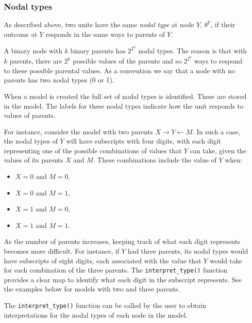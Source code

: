 \documentclass[
  11pt,
  article]{jss}
\providecommand{\tightlist}{%
  \setlength{\itemsep}{0pt}\setlength{\parskip}{0pt}}\usepackage{longtable,booktabs,array}
\begin{document}
\hypertarget{sec-nodal-types}{%
\subsubsection{Nodal types}\label{sec-nodal-types}}

As described above, two units have the same \emph{nodal type} at node
\(Y\), \(\theta^Y\), if their outcome at \(Y\) responds in the same ways
to parents of \(Y\).

A binary node with \(k\) binary parents has \(2^{2^k}\) nodal types. The
reason is that with \(k\) parents, there are \(2^k\) possible values of
the parents and so \(2^{2^k}\) ways to respond to these possible
parental values. As a convention we say that a node with no parents has
two nodal types (0 or 1).

When a model is created the full set of nodal types is identified. These
are stored in the model. The labels for these nodal types indicate how
the unit responds to values of parents.

For instance, consider the model with two parents
\(X \rightarrow Y \leftarrow M.\) In such a case, the nodal types of
\(Y\) will have subscripts with four digits, with each digit
representing one of the possible combinations of values that \(Y\) can
take, given the values of its parents \(X\) and \(M.\) These
combinations include the value of \(Y\) when:

\begin{itemize}
\tightlist
\item
  \(X = 0\) and \(M = 0\),
\item
  \(X = 0\) and \(M = 1\),
\item
  \(X = 1\) and \(M = 0\),
\item
  \(X = 1\) and \(M = 1\).
\end{itemize}

As the number of parents increases, keeping track of what each digit
represents becomes more difficult. For instance, if \(Y\) had three
parents, its nodal types would have subscripts of eight digits, each
associated with the value that \(Y\) would take for each combination of
the three parents. The \texttt{interpret\_type()} function provides a
clear map to identify what each digit in the subscript represents. See
the examples below for models with two and three parents.

The \texttt{interpret\_type()} function can be called by the user to
obtain interpretations for the nodal types of each node in the model.
\end{document}
